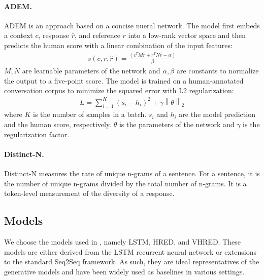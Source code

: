 \documentclass[runningheads]{llncs}
\begin{document}
    \paragraph{ADEM.}
    ADEM \cite{ADEM} is an approach based on a concise nueral network. The model first embeds a context $c$, response $\hat{r}$, and reference $r$ into a low-rank vector space and then predicts the human score with a linear combination of the input features:
    \begin{align}
        s(c, r, \hat{r}) = \frac{(c^T M \hat{r} + r^T N \hat{r} - \alpha)}{\beta}
    \end{align}
    $M, N$ are learnable parameters of the network and $\alpha, \beta$ are constants to normalize the output to a five-point score. The model is trained on a human-annotated conversation corpus to minimize the squared error with L2 regularization:
    \begin{align}
        L = \sum_{i=1}^{K} (s_i - h_i)^2 + \gamma \left\| \theta \right\| _2
    \end{align}
    where $K$ is the number of samples in a batch. $s_i$ and $h_i$ are the model prediction and the human score, respectively. $\theta$ is the parameters of the network and $\gamma$ is the regularization factor.

    \paragraph{Distinct-N.}
    Distinct-N \cite{MMI} measures the rate of unique n-grams of a sentence. For a sentence, it is the number of unique n-grams divided by the total number of n-grams. It is a token-level measurement of the diversity of a response.

    \subsection{Models}
    We choose the models used in \cite{VHRED}, namely LSTM, HRED, and VHRED. These models are either derived from the LSTM recurrent neural network \cite{LSTM} or extensions to the standard Seq2Seq framework. As such, they are ideal representatives of the generative models and have been widely used as baselines in various settings.
\end{document}
